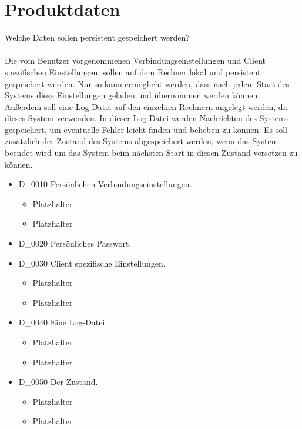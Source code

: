 \chapter{Produktdaten}
Welche Daten sollen persistent gespeichert werden?\ \\ \\
Die vom Benutzer vorgenommenen Verbindungseinstellungen und Client spezifischen Einstellungen, sollen auf dem Rechner lokal und persistent gespeichert werden. Nur so kann ermöglicht werden, dass nach jedem Start des Systems diese Einstellungen geladen und übernommen werden können.\ \\
Außerdem soll eine Log-Datei auf den einzelnen Rechnern angelegt werden, die dieses System verwenden. In dieser Log-Datei werden Nachrichten des Systems gespeichert, um eventuelle Fehler leicht finden und beheben zu können.
Es soll zusätzlich der Zustand des Systems abgespeichert werden, wenn das System beendet wird um das System beim nächsten Start in diesen Zustand versetzen zu können.
\renewcommand{\labelitemi}{•}
\begin{itemize}
	\item D\_0010 Persönlichen Verbindungseinstellungen.
	\begin{itemize}
		\item Platzhalter
		\item Platzhalter
	\end{itemize}
	\item D\_0020 Persönliches Passwort.
	\item D\_0030 Client spezifische Einstellungen.
	\begin{itemize}
		\item Platzhalter
		\item Platzhalter
	\end{itemize}
	\item D\_0040 Eine Log-Datei.
	\begin{itemize}
		\item Platzhalter
		\item Platzhalter
	\end{itemize}
	\item D\_0050 Der Zustand.
	\begin{itemize}
		\item Platzhalter
		\item Platzhalter
	\end{itemize}
\end{itemize}